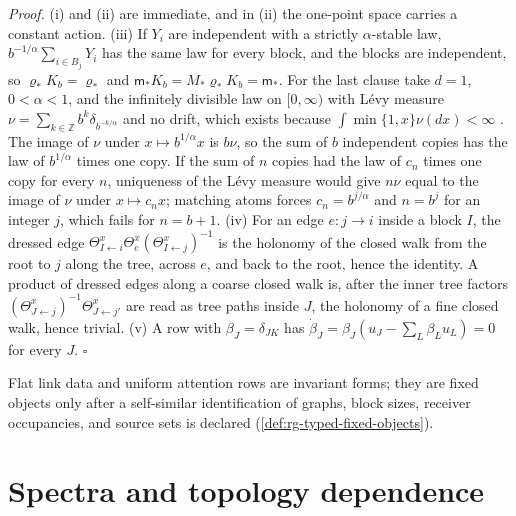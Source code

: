 \noindent\emph{Proof.}
(i) and (ii) are immediate, and in (ii) the one-point space carries a constant
action. (iii) If \(Y_i\) are independent with a strictly \(\alpha\)-stable law,
\(b^{-1/\alpha}\sum_{i\in B_j}Y_i\) has the same law for every block, and the
blocks are independent, so \(\varrho_*K_b=\varrho_*\) and
\(\mathsf m_*K_b=M_*\varrho_*K_b=\mathsf m_*\). For the last clause take \(d=1\),
\(0<\alpha<1\), and the infinitely divisible law on \([0,\infty)\) with L\'evy
measure \(\nu=\sum_{k\in\mathbb Z}b^k\delta_{b^{-k/\alpha}}\) and no drift, which
exists because \(\int\min\{1,x\}\nu(dx)<\infty\)
\citep[Theorem~8.1]{Sato1999}. The image of \(\nu\) under
\(x\mapsto b^{1/\alpha}x\) is \(b\nu\), so the sum of \(b\) independent copies
has the law of \(b^{1/\alpha}\) times one copy. If the sum of \(n\) copies had
the law of \(c_n\) times one copy for every \(n\), uniqueness of the L\'evy
measure \citep[Theorem~8.1]{Sato1999} would give \(n\nu\) equal to the image of
\(\nu\) under \(x\mapsto c_nx\); matching atoms forces
\(c_n=b^{j/\alpha}\) and \(n=b^j\) for an integer \(j\), which fails for
\(n=b+1\). (iv) For an edge \(e:j\to i\) inside a block \(I\), the dressed edge
\(\Theta^x_{I\leftarrow i}\Theta^x_e(\Theta^x_{I\leftarrow j})^{-1}\) is the
holonomy of the closed walk from the root to \(j\) along the tree, across
\(e\), and back to the root, hence the identity. A product of dressed edges
along a coarse closed walk is, after the inner tree factors
\((\Theta^x_{J\leftarrow j})^{-1}\Theta^x_{J\leftarrow j'}\) are read as tree
paths inside \(J\), the holonomy of a fine closed walk, hence trivial. (v) A
row with \(\beta_J=\delta_{JK}\) has
\(\dot\beta_J=\beta_J(u_J-\sum_L\beta_Lu_L)=0\) for every \(J\). \(\square\)

Flat link data and uniform attention rows are invariant forms; they are fixed
objects only after a self-similar identification of graphs, block sizes,
receiver occupancies, and source sets is declared
(\cref{def:rg-typed-fixed-objects}).

\section{Spectra and topology dependence}
\label{sec:rg-action-spectrum-topology}

